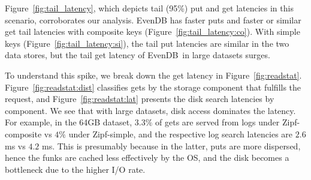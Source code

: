 \documentclass[sigplan,10pt]{acmart}
\newcommand{\sys}{EvenDB}
\begin{document}
Figure~\ref{fig:tail_latency}, which depicts tail (95\%) put and get latencies in this scenario, 
corroborates our analysis. \sys\/ has faster puts and faster or similar get tail latencies with composite keys
(Figure~\ref{fig:tail_latency:co}). With simple keys (Figure~\ref{fig:tail_latency:si}),  
the tail put latencies are similar in the two data stores, but the tail get latency of \sys\ 
in large datasets surges.

To understand this spike, we break down the get latency in  Figure~\ref{fig:readstat}. 
Figure~\ref{fig:readstat:dist} classifies gets by the storage  component 
that fulfills the request, and Figure~\ref{fig:readstat:lat} presents the disk search latencies by component. 
We see that with large datasets, disk access dominates the latency.
For example, in the 64GB dataset, $3.3\%$ of gets are served from logs under Zipf-composite vs $4\%$ under Zipf-simple,
and the respective log search latencies are $2.6$ ms vs $4.2$ ms. This is presumably because in the latter, puts are more dispersed, 
hence the funks are cached less effectively by the OS, and the disk becomes a bottleneck due to the higher I/O rate.
\end{document}
